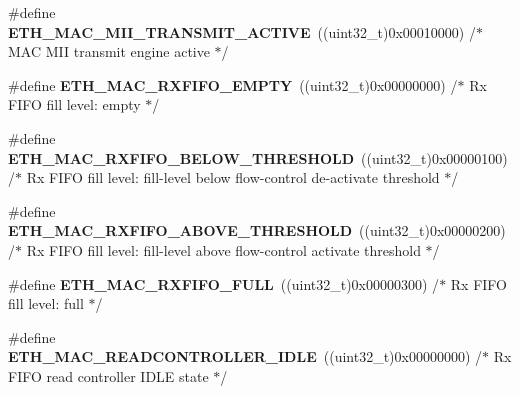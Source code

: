 \begin{DoxyCompactItemize}
\item 
\hypertarget{group___h_a_l___e_t_h___aliased___defines_ga569a78f6147f1068ddeed3897776b6f3}{\#define {\bfseries E\-T\-H\-\_\-\-M\-A\-C\-\_\-\-M\-I\-I\-\_\-\-T\-R\-A\-N\-S\-M\-I\-T\-\_\-\-A\-C\-T\-I\-V\-E}~((uint32\-\_\-t)0x00010000)  /$\ast$ M\-A\-C M\-I\-I transmit engine active $\ast$/}\label{group___h_a_l___e_t_h___aliased___defines_ga569a78f6147f1068ddeed3897776b6f3}

\item 
\hypertarget{group___h_a_l___e_t_h___aliased___defines_gab0663cbb0510f2d3bdc9fdaea103725e}{\#define {\bfseries E\-T\-H\-\_\-\-M\-A\-C\-\_\-\-R\-X\-F\-I\-F\-O\-\_\-\-E\-M\-P\-T\-Y}~((uint32\-\_\-t)0x00000000)  /$\ast$ Rx F\-I\-F\-O fill level\-: empty $\ast$/}\label{group___h_a_l___e_t_h___aliased___defines_gab0663cbb0510f2d3bdc9fdaea103725e}

\item 
\hypertarget{group___h_a_l___e_t_h___aliased___defines_ga1ac34f74c22709a45510fe557e6b1866}{\#define {\bfseries E\-T\-H\-\_\-\-M\-A\-C\-\_\-\-R\-X\-F\-I\-F\-O\-\_\-\-B\-E\-L\-O\-W\-\_\-\-T\-H\-R\-E\-S\-H\-O\-L\-D}~((uint32\-\_\-t)0x00000100)  /$\ast$ Rx F\-I\-F\-O fill level\-: fill-\/level below flow-\/control de-\/activate threshold $\ast$/}\label{group___h_a_l___e_t_h___aliased___defines_ga1ac34f74c22709a45510fe557e6b1866}

\item 
\hypertarget{group___h_a_l___e_t_h___aliased___defines_ga10d4ac5728fe85efe0ec19699e4c90f0}{\#define {\bfseries E\-T\-H\-\_\-\-M\-A\-C\-\_\-\-R\-X\-F\-I\-F\-O\-\_\-\-A\-B\-O\-V\-E\-\_\-\-T\-H\-R\-E\-S\-H\-O\-L\-D}~((uint32\-\_\-t)0x00000200)  /$\ast$ Rx F\-I\-F\-O fill level\-: fill-\/level above flow-\/control activate threshold $\ast$/}\label{group___h_a_l___e_t_h___aliased___defines_ga10d4ac5728fe85efe0ec19699e4c90f0}

\item 
\hypertarget{group___h_a_l___e_t_h___aliased___defines_gaa7b77138ec3256a713a8aa74ea94f0c1}{\#define {\bfseries E\-T\-H\-\_\-\-M\-A\-C\-\_\-\-R\-X\-F\-I\-F\-O\-\_\-\-F\-U\-L\-L}~((uint32\-\_\-t)0x00000300)  /$\ast$ Rx F\-I\-F\-O fill level\-: full $\ast$/}\label{group___h_a_l___e_t_h___aliased___defines_gaa7b77138ec3256a713a8aa74ea94f0c1}

\item 
\hypertarget{group___h_a_l___e_t_h___aliased___defines_ga0be388dadd31f6a12f2ee9b4ee6c31bb}{\#define {\bfseries E\-T\-H\-\_\-\-M\-A\-C\-\_\-\-R\-E\-A\-D\-C\-O\-N\-T\-R\-O\-L\-L\-E\-R\-\_\-\-I\-D\-L\-E}~((uint32\-\_\-t)0x00000000)  /$\ast$ Rx F\-I\-F\-O read controller I\-D\-L\-E state $\ast$/}\label{group___h_a_l___e_t_h___aliased___defines_ga0be388dadd31f6a12f2ee9b4ee6c31bb}


\end{DoxyCompactItemize}
